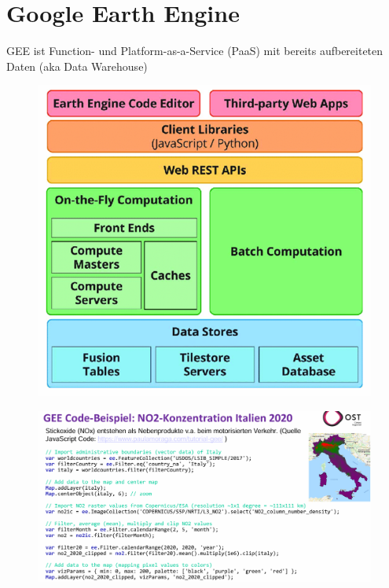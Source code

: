 \documentclass[../Main.tex]{subfiles}
\begin{document}
\section{Google Earth Engine}
GEE ist Function- und Platform-as-a-Service (PaaS) mit bereits 
aufbereiteten Daten (aka Data Warehouse)
\begin{figure}[H]
    \centering
    \includegraphics[width=0.5\linewidth]{Images/datan/gee-arch.png}
\end{figure}
\begin{figure}[H]
    \centering
    \includegraphics[width=0.75\linewidth]{Images/datan/gee-example.png}
\end{figure}
\end{document}
